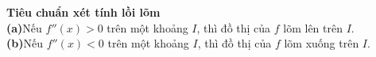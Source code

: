 \vspace{0.3cm}
\begin{tcolorbox}[colback=white, colframe=stewartred, boxrule=0.8pt, arc=0mm, left=8pt, right=8pt, top=6pt, bottom=6pt]
  {\color{stewartred}\textbf{Tiêu chuẩn xét tính lồi lõm}}\\[4pt]
  \textbf{(a)}\enspace Nếu $f''(x) > 0$ trên một khoảng $I$, thì đồ thị của $f$ lõm lên trên $I$.\\[3pt]
  \textbf{(b)}\enspace Nếu $f''(x) < 0$ trên một khoảng $I$, thì đồ thị của $f$ lõm xuống trên $I$.
\end{tcolorbox}
